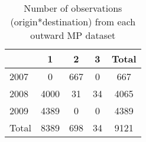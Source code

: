 \begin{table}[htbp]\centering
\caption{Number of observations (origin*destination) from each outward MP dataset}
\begin{tabular}{l*{4}{c}}
\toprule
            &           1&           2&           3&       Total\\
\midrule
2007        &           0&         667&           0&         667\\
2008        &        4000&          31&          34&        4065\\
2009        &        4389&           0&           0&        4389\\
Total       &        8389&         698&          34&        9121\\
\bottomrule
\end{tabular}
\end{table}
